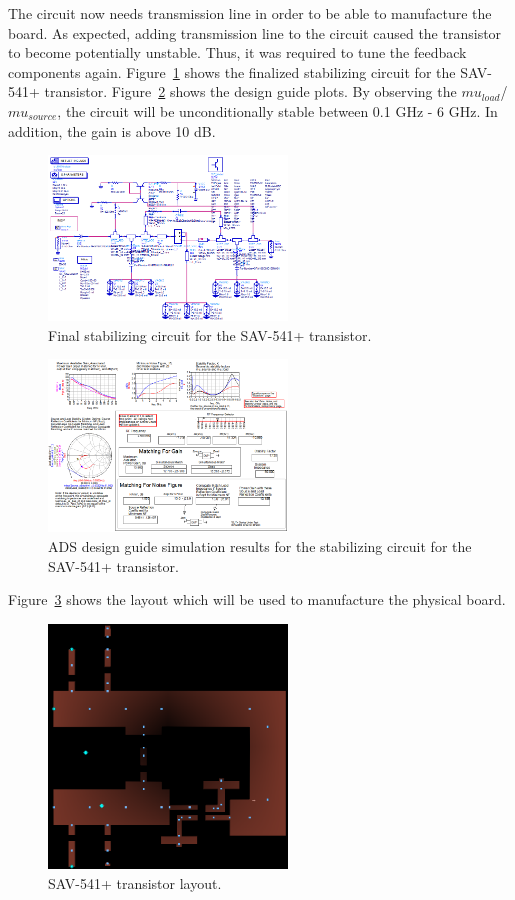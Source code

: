 \documentclass[conference]{IEEEtran}
\begin{document}
The circuit now needs transmission line in order to be able to manufacture the board.  As expected, adding transmission line to the circuit caused the transistor to become potentially unstable.  Thus, it was required to tune the feedback components again.  Figure~\ref{fig:finalstabcircuit} shows the finalized stabilizing circuit for the SAV-541+ transistor.  Figure~\ref{fig:finalstabsimulation} shows the design guide plots.  By observing the $mu_{load}$/$mu_{source}$, the circuit will be unconditionally stable between 0.1 GHz - 6 GHz.  In addition, the gain is above 10 dB.

\begin{figure}[!h]
\centering
\includegraphics[width=2.5in]{pics/FinalStabilizingCircuit.png}
\caption{Final stabilizing circuit for the SAV-541+ transistor.}
\label{fig:finalstabcircuit}
\end{figure}

\begin{figure}[!h]
\centering
\includegraphics[width=2.5in]{pics/FinalStabilizingSimulation.png}
\caption{ADS design guide simulation results for the stabilizing circuit for the SAV-541+ transistor.}
\label{fig:finalstabsimulation}
\end{figure}

Figure~\ref{fig:lnaLayout} shows the layout which will be used to manufacture the physical board.
\begin{figure}[!h]
\centering
\includegraphics[width=2.5in]{LNApics/LNAlayout.png}
\caption{SAV-541+ transistor layout.}
\label{fig:lnaLayout}
\end{figure}
\end{document}
